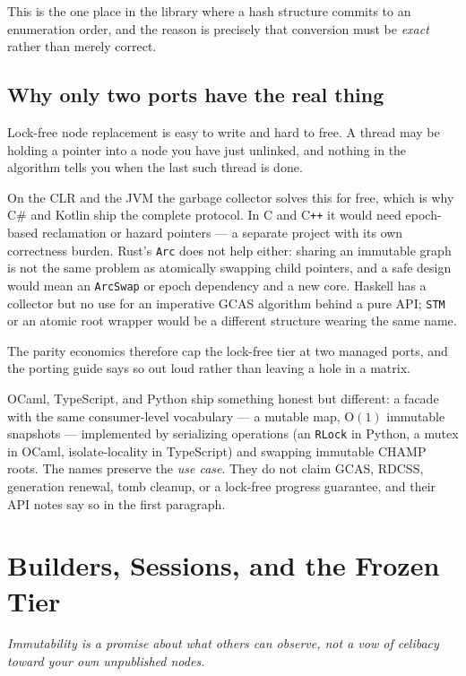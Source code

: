 \documentclass[11pt,twoside,openright]{book}
\newcommand{\code}[1]{\texorpdfstring{\textcolor{d7ink}{\texttt{#1}}}{#1}}
\newcommand{\bigoh}[1]{$\mathrm{O}(#1)$}
\newcommand{\motto}[1]{%
  \begingroup
  \vspace{-4pt}\hfill\begin{minipage}{0.80\textwidth}
    \raggedleft\itshape\color{d7slate}\small #1\par
  \end{minipage}\par\vspace{18pt}
  \endgroup}
\begin{document}
This is the one place in the library where a hash structure commits to an
enumeration order, and the reason is precisely that conversion must be
\emph{exact} rather than merely correct.

\section{Why only two ports have the real thing}

\begin{caveatbox}
Lock-free node replacement is easy to write and hard to free. A thread may be
holding a pointer into a node you have just unlinked, and nothing in the
algorithm tells you when the last such thread is done.

On the CLR and the JVM the garbage collector solves this for free, which is why
C\# and Kotlin ship the complete protocol. In C and C\texttt{++} it would need
epoch-based reclamation or hazard pointers --- a separate project with its own
correctness burden. Rust's \code{Arc} does not help either: sharing an
immutable graph is not the same problem as atomically swapping child pointers,
and a safe design would mean an \code{ArcSwap} or epoch dependency and a new
core. Haskell has a collector but no use for an imperative GCAS algorithm behind
a pure API; \code{STM} or an atomic root wrapper would be a different structure
wearing the same name.

The parity economics therefore cap the lock-free tier at two managed ports, and
the porting guide says so out loud rather than leaving a hole in a matrix.
\end{caveatbox}

OCaml, TypeScript, and Python ship something honest but different: a facade with
the same consumer-level vocabulary --- a mutable map, \bigoh{1} immutable
snapshots --- implemented by serializing operations (an \code{RLock} in Python, a
mutex in OCaml, isolate-locality in TypeScript) and swapping immutable CHAMP
roots. The names preserve the \emph{use case}. They do not claim GCAS, RDCSS,
generation renewal, tomb cleanup, or a lock-free progress guarantee, and their
API notes say so in the first paragraph.

\chapter{Builders, Sessions, and the Frozen Tier}
\label{ch:lifecycle}

\motto{Immutability is a promise about what others can observe, not a vow of
celibacy toward your own unpublished nodes.}
\end{document}
